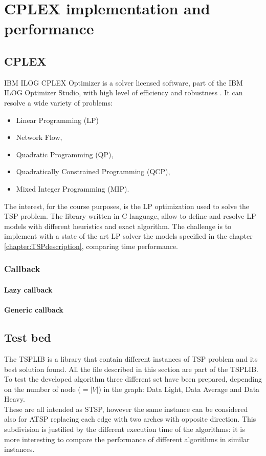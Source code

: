 \chapter{CPLEX implementation and performance}

\section{CPLEX}
IBM ILOG CPLEX Optimizer is a solver licensed software, part of the IBM ILOG Optimizer Studio, with high level of efficiency and robustness \cite{IBMILOGCPLEX}. It can resolve a wide variety of problems:
\begin{itemize}
	\item Linear Programming (LP)
	\item Network Flow,
	\item Quadratic Programming (QP),
	\item Quadratically Constrained Programming (QCP),
	\item Mixed Integer Programming (MIP).
\end{itemize}
The interest, for the course purposes, is the LP optimization used to solve the TSP problem. The library written in C language, allow to define and resolve LP models with different heuristics and exact algorithm. The challenge is to implement with a state of the art LP solver the models specified in the chapter \ref{chapter:TSPdescription}, comparing time performance. 

\subsection{Callback}
\subsubsection{Lazy callback}
\subsubsection{Generic callback}

\section{Test bed} \label{sec:testset}
The TSPLIB is a library \cite{TSPLIB} that contain different instances of TSP problem and its best solution found. All the file described in this section are part of the TSPLIB. To test the developed algorithm three different set have been prepared, depending on the number of node ($=|V|$) in the graph: Data Light, Data Average and Data Heavy.\\
These are all intended as STSP, however the same instance can be considered also for ATSP replacing each edge with two arches with opposite direction. This subdivision is justified by the different execution time of the algorithms: it is more interesting to compare the performance of different algorithms in similar instances.\\

